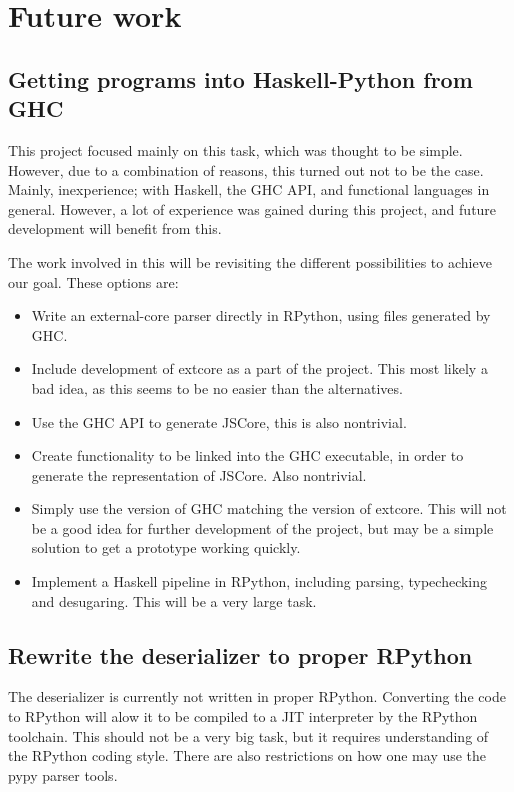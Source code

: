 \section{Future work}

\subsection{Getting programs into Haskell-Python from GHC}

This project focused mainly on this task, which was thought to be simple.
However, due to a combination of reasons, this turned out not to be the case.
Mainly, inexperience; with Haskell, the GHC API, and functional languages in 
general. However, a lot of experience was gained during this project, and
future development will benefit from this.

The work involved in this will be revisiting the different possibilities to
achieve our goal. These options are:

\begin{itemize}
\item Write an external-core parser directly in RPython, using files generated by GHC.
\item Include development of extcore as a part of the project. This most likely a bad
idea, as this seems to be no easier than the alternatives.
\item Use the GHC API to generate JSCore, this is also nontrivial.
\item Create functionality to be linked into the GHC executable, in order to generate the
representation of JSCore. Also nontrivial.
\item Simply use the version of GHC matching the version of extcore. This will not be
a good idea for further development of the project, but may be a simple solution to get
a prototype working quickly.
\item Implement a Haskell pipeline in RPython, including parsing, typechecking and desugaring.
This will be a very large task.
\end{itemize}

\subsection{Rewrite the deserializer to proper RPython}

The deserializer is currently not written in proper RPython. 
Converting the code to RPython will alow it to be compiled to a JIT interpreter by
the RPython toolchain. This should not be a very big task, but it requires understanding
of the RPython coding style. There are also restrictions on how one may use the pypy parser
tools.

